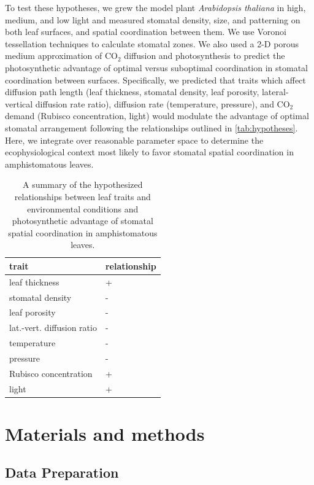 \documentclass[12pt,halfline,a4paper,]{ouparticle}
\begin{document}
To test these hypotheses, we grew the model plant \emph{Arabidopsis
thaliana} in high, medium, and low light and measured stomatal density,
size, and patterning on both leaf surfaces, and spatial coordination
between them. We use Voronoi tessellation techniques to calculate
stomatal zones. We also used a 2-D porous medium approximation of
CO\(_2\) diffusion and photosynthesis to predict the photosynthetic
advantage of optimal versus suboptimal coordination in stomatal
coordination between surfaces. Specifically, we predicted that traits
which affect diffusion path length (leaf thickness, stomatal density,
leaf porosity, lateral-vertical diffusion rate ratio), diffusion rate
(temperature, pressure), and CO\(_2\) demand (Rubisco concentration,
light) would modulate the advantage of optimal stomatal arrangement
following the relationships outlined in \autoref{tab:hypotheses}. Here,
we integrate over reasonable parameter space to determine the
ecophysiological context most likely to favor stomatal spatial
coordination in amphistomatous leaves.

\begin{table}[ht]
\centering
\begin{tabular}{ll}
  \hline
trait & relationship \\ 
  \hline
leaf thickness & + \\ 
  stomatal density & - \\ 
  leaf porosity & - \\ 
  lat.-vert. diffusion ratio & - \\ 
  temperature & - \\ 
  pressure & - \\ 
  Rubisco concentration & + \\ 
  light & + \\ 
   \hline
\end{tabular}
\caption{A summary of the hypothesized relationships between leaf traits and environmental conditions and photosynthetic advantage of stomatal spatial coordination in amphistomatous leaves.} 
\label{tab:hypotheses}
\end{table}

\hypertarget{materials-and-methods}{%
\section{Materials and methods}\label{materials-and-methods}}

\hypertarget{data-preparation}{%
\subsection{Data Preparation}\label{data-preparation}}
\end{document}
